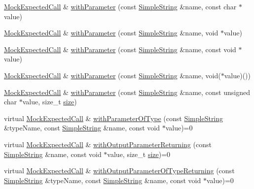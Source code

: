 \begin{DoxyCompactItemize}
\item 
\hyperlink{class_mock_expected_call}{Mock\+Expected\+Call} \& \hyperlink{class_mock_expected_call_ac5f6920554d1ecc0a9bbf417d5c69375}{with\+Parameter} (const \hyperlink{class_simple_string}{Simple\+String} \&name, const char $\ast$value)
\item 
\hyperlink{class_mock_expected_call}{Mock\+Expected\+Call} \& \hyperlink{class_mock_expected_call_abb0ab5ac7408454bb144beaa438030ac}{with\+Parameter} (const \hyperlink{class_simple_string}{Simple\+String} \&name, void $\ast$value)
\item 
\hyperlink{class_mock_expected_call}{Mock\+Expected\+Call} \& \hyperlink{class_mock_expected_call_a21e7495ae9bfea1385978133b6a732ec}{with\+Parameter} (const \hyperlink{class_simple_string}{Simple\+String} \&name, const void $\ast$value)
\item 
\hyperlink{class_mock_expected_call}{Mock\+Expected\+Call} \& \hyperlink{class_mock_expected_call_aba33fa78bdbe902780310feeea1be85c}{with\+Parameter} (const \hyperlink{class_simple_string}{Simple\+String} \&name, void($\ast$value)())
\item 
\hyperlink{class_mock_expected_call}{Mock\+Expected\+Call} \& \hyperlink{class_mock_expected_call_ad4aa71d2fe21ec752c8d66491038001b}{with\+Parameter} (const \hyperlink{class_simple_string}{Simple\+String} \&name, const unsigned char $\ast$value, size\+\_\+t \hyperlink{gst__avb__playbin_8c_a439227feff9d7f55384e8780cfc2eb82}{size})
\item 
virtual \hyperlink{class_mock_expected_call}{Mock\+Expected\+Call} \& \hyperlink{class_mock_expected_call_a70e1aed9abdc98edf8d654c7e19c377e}{with\+Parameter\+Of\+Type} (const \hyperlink{class_simple_string}{Simple\+String} \&type\+Name, const \hyperlink{class_simple_string}{Simple\+String} \&name, const void $\ast$value)=0
\item 
virtual \hyperlink{class_mock_expected_call}{Mock\+Expected\+Call} \& \hyperlink{class_mock_expected_call_a54ca69b52b3b25995996551098c155aa}{with\+Output\+Parameter\+Returning} (const \hyperlink{class_simple_string}{Simple\+String} \&name, const void $\ast$value, size\+\_\+t \hyperlink{gst__avb__playbin_8c_a439227feff9d7f55384e8780cfc2eb82}{size})=0
\item 
virtual \hyperlink{class_mock_expected_call}{Mock\+Expected\+Call} \& \hyperlink{class_mock_expected_call_a22dc10d91edbf3fd199be9166b1d3e50}{with\+Output\+Parameter\+Of\+Type\+Returning} (const \hyperlink{class_simple_string}{Simple\+String} \&type\+Name, const \hyperlink{class_simple_string}{Simple\+String} \&name, const void $\ast$value)=0

\end{DoxyCompactItemize}
